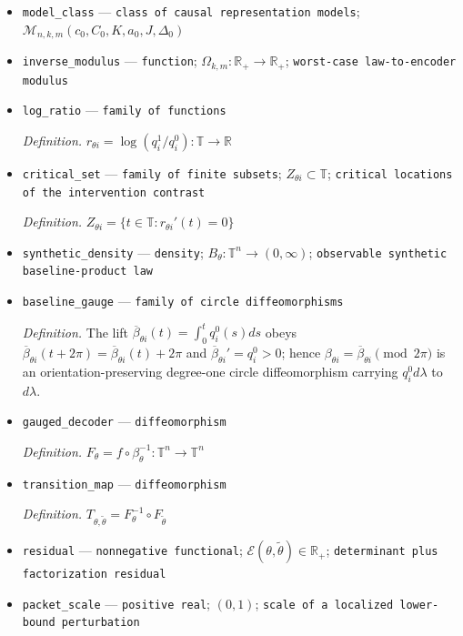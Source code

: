 \documentclass{article}
\begin{document}
\begin{itemize}
  \item \texttt{model\_\allowbreak{}class} --- \texttt{class of causal representation models}; \(\mathcal M_{n,k,m}(c_0,C_0,K,a_0,J,\Delta_0)\)
  \item \texttt{inverse\_\allowbreak{}modulus} --- \texttt{function}; \(\Omega_{k,m}:\mathbb R_+\to\mathbb R_+\); \texttt{worst-\allowbreak{}case law-\allowbreak{}to-\allowbreak{}encoder modulus}
  \item \texttt{log\_\allowbreak{}ratio} --- \texttt{family of functions}
  \par\smallskip\noindent\emph{Definition.} \(r_{\theta i}=\log(q_i^1/q_i^0):\mathbb T\to\mathbb R\)
  \item \texttt{critical\_\allowbreak{}set} --- \texttt{family of finite subsets}; \(Z_{\theta i}\subset\mathbb T\); \texttt{critical locations of the intervention contrast}
  \par\smallskip\noindent\emph{Definition.} \(Z_{\theta i}=\{t\in\mathbb T:r_{\theta i}'(t)=0\}\)
  \item \texttt{synthetic\_\allowbreak{}density} --- \texttt{density}; \(B_\theta:\mathbb T^n\to(0,\infty)\); \texttt{observable synthetic baseline-\allowbreak{}product law}
  \item \texttt{baseline\_\allowbreak{}gauge} --- \texttt{family of circle diffeomorphisms}
  \par\smallskip\noindent\emph{Definition.} The lift \(\overline\beta_{\theta i}(t)=\int_0^tq_i^0(s)ds\) obeys \(\overline\beta_{\theta i}(t+2\pi)=\overline\beta_{\theta i}(t)+2\pi\) and \(\overline\beta_{\theta i}'=q_i^0>0\); hence \(\beta_{\theta i}=\overline\beta_{\theta i}\pmod{2\pi}\) is an orientation-preserving degree-one circle diffeomorphism carrying \(q_i^0d\lambda\) to \(d\lambda\).
  \item \texttt{gauged\_\allowbreak{}decoder} --- \texttt{diffeomorphism}
  \par\smallskip\noindent\emph{Definition.} \(F_\theta=f\circ\beta_\theta^{-1}:\mathbb T^n\to\mathbb T^n\)
  \item \texttt{transition\_\allowbreak{}map} --- \texttt{diffeomorphism}
  \par\smallskip\noindent\emph{Definition.} \(T_{\theta,\widetilde\theta}=F_\theta^{-1}\circ F_{\widetilde\theta}\)
  \item \texttt{residual} --- \texttt{nonnegative functional}; \(\mathcal E(\theta,\widetilde\theta)\in\mathbb R_+\); \texttt{determinant plus factorization residual}
  \item \texttt{packet\_\allowbreak{}scale} --- \texttt{positive real}; \((0,1)\); \texttt{scale of a localized lower-\allowbreak{}bound perturbation}

\end{itemize}
\end{document}
